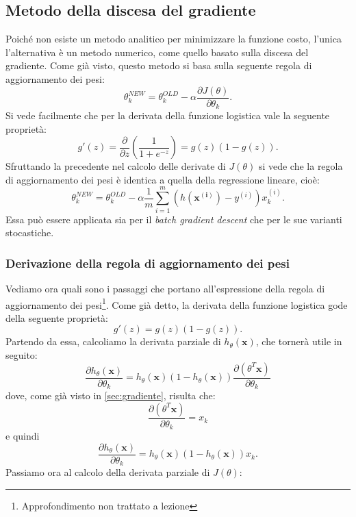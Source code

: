 \subsection{Metodo della discesa del gradiente}
Poiché non esiste un metodo analitico per minimizzare la funzione costo, l'unica l'alternativa è un metodo numerico, come quello basato sulla discesa del gradiente. Come già visto, questo metodo si basa sulla seguente regola di aggiornamento dei pesi:
\begin{equation*}
  \theta_k^{NEW} = \theta_k^{OLD} - \alpha \frac{ \partial J(\theta)}{ \partial \theta_k}.
\end{equation*}
Si vede facilmente che per la derivata della funzione logistica vale la seguente proprietà:
\begin{equation*}
g'(z) = \frac{\partial}{\partial z}\left( \frac{1}{1+e^{-z}}\right)=g(z)(1-g(z)).
\end{equation*}
Sfruttando la precedente nel calcolo delle derivate di $J(\theta)$ si vede che la regola di aggiornamento dei pesi è identica a quella della regressione lineare, cioè:
\begin{equation*}
   \theta_k^{NEW} = \theta_k^{OLD} - \alpha \frac{1}{m} \sum_{i=1}^m (h(\mathbf{x^{(i)}})-y^{(i)}) x^{(i)}_k.\end{equation*}
Essa può essere applicata sia per il \emph{batch gradient descent} che per le sue varianti stocastiche.

\subsubsection{Derivazione della regola di aggiornamento dei pesi}\label{sec:dim_log_regr}
Vediamo ora quali sono i passaggi che portano all'espressione della regola di aggiornamento dei pesi\footnote{Approfondimento non trattato a lezione}. Come già detto, la derivata della funzione logistica gode della seguente proprietà:
\begin{equation*}
g'(z) =g(z)(1-g(z)).
\end{equation*}
Partendo da essa, calcoliamo la derivata parziale di $h_\theta(\mathbf{x})$, che tornerà utile in seguito:
\begin{equation*}
\frac{\partial h_\theta(\mathbf{x})}{\partial \theta_k} = h_\theta(\mathbf{x}) (1-h_\theta(\mathbf{x})) \frac{\partial (\theta^T \mathbf{x})}{\partial \theta_k}
\end{equation*}
dove, come già visto in \autoref{sec:gradiente}, risulta che:
\begin{equation*}
\frac{\partial (\theta^T \mathbf{x})}{\partial \theta_k} = x_k
\end{equation*}
e quindi
\begin{equation*}
\frac{\partial h_\theta(\mathbf{x})}{\partial \theta_k} = h_\theta(\mathbf{x}) (1-h_\theta(\mathbf{x})) x_k.
\end{equation*}
Passiamo ora al calcolo della derivata parziale di $J(\theta)$:


